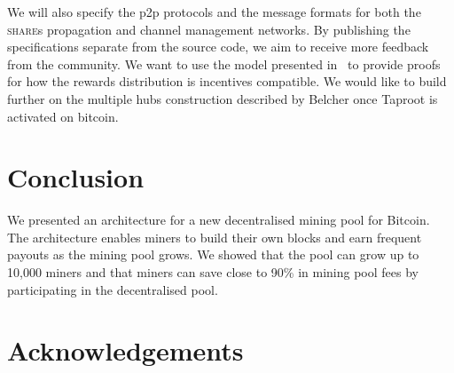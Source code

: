 \documentclass{article}
\begin{document}
We will also specify the p2p protocols and the message formats for
both the \textsc{share}s propagation and channel management
networks. By publishing the specifications separate from the source
code, we aim to receive more feedback from the community. We want to
use the model presented in~\cite{incentives-compatible} to provide
proofs for how the rewards distribution is incentives compatible. We
would like to build further on the multiple hubs construction
described by Belcher once Taproot is activated on bitcoin.

\section{Conclusion}

We presented an architecture for a new decentralised mining pool for
Bitcoin. The architecture enables miners to build their own blocks and
earn frequent payouts as the mining pool grows. We showed that the
pool can grow up to 10,000 miners and that miners can save close to
90\% in mining pool fees by participating in the decentralised pool.

\section{Acknowledgements}


 

\end{document}
